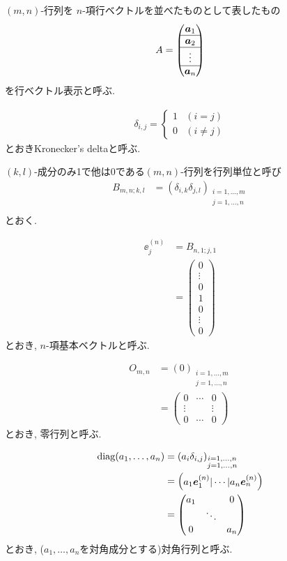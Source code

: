 $(m,n)$-行列を
$n$-項行ベクトルを並べたものとして表したもの
\begin{align*}
  A=\begin{pmatrix}\boldsymbol{a}_1\\\hline \boldsymbol{a}_2\\\hline\vdots\\\hline\boldsymbol{a}_n\end{pmatrix}
\end{align*}
を行ベクトル表示と呼ぶ.

\begin{align*}
  \delta_{i,j}=
  \begin{cases}
    1&(i=j)\\
    0&(i\neq j)
  \end{cases}
\end{align*}
とおきKronecker's deltaと呼ぶ.

$(k,l)$-成分のみ1で他は0である$(m,n)$-行列を行列単位と呼び
\begin{align*}
  B_{m,n;k,l}
  &=(\delta_{i,k}\delta_{j,l})_{\substack{i=1,\ldots,m\\j=1,\ldots,n}}\\
\end{align*}
とおく.

\begin{align*}
  \ee^{(n)}_j
  &=B_{n,1;j,1}\\
  &=\begin{pmatrix}
  0\\\vdots\\0\\1\\0\\\vdots\\0
  \end{pmatrix}
\end{align*}
とおき, $n$-項基本ベクトルと呼ぶ.

\begin{align*}
  O_{m,n}&=(0)_{\substack{i=1,\ldots,m\\j=1,\ldots,n}}\\
  &=
  \begin{pmatrix}
    0&\cdots&0\\
    \vdots&&\vdots\\
    0&\cdots&0
  \end{pmatrix}
\end{align*}
とおき,
零行列と呼ぶ.


\begin{align*}
  \operatorname{diag}(a_1,\ldots,a_n)
  &=(a_i\delta_{i,j})_{\substack{i=1,\ldots,n\\j=1,\ldots,n}}\\
  &=\begin{pmatrix}a_1\boldsymbol{e}^{(n)}_1|\cdots|a_n\boldsymbol{e}^{(n)}_n\end{pmatrix}\\
  &=\begin{pmatrix}
  a_1&&0\\
  &\ddots&\\
  0&&a_n
  \end{pmatrix}
\end{align*}
とおき,
($a_1,\ldots,a_n$を対角成分とする)対角行列と呼ぶ.


